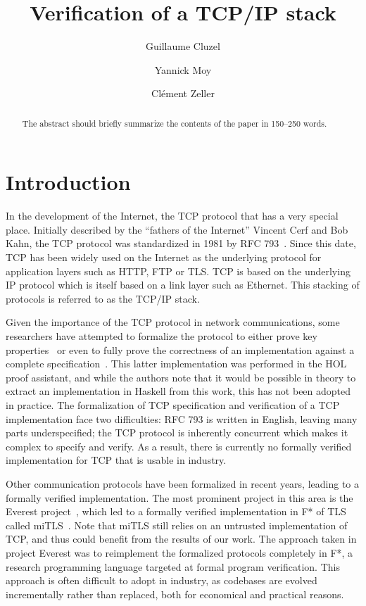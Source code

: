 \documentclass[runningheads]{llncs}
\title{Verification of a TCP/IP stack}
\author{Guillaume Cluzel\inst{1,2} \and
        Yannick Moy\inst{1} \and
        Cl\'ement Zeller\inst{3}}
\institute{Adacore \and
        \'Ecole Normale Sup\'erieure de Lyon \and
        Oryx Embedded}
\begin{document}

\maketitle

\begin{abstract}
    The abstract should briefly summarize the contents of the paper in
    150--250 words.

\end{abstract}

\section{Introduction}

    In the development of the Internet, the TCP protocol that has a very special place.
    Initially described by the ``fathers of the Internet'' Vincent Cerf and Bob Kahn, the TCP protocol was standardized in 1981 by RFC 793~\cite{rfc793}.
    Since this date, TCP has been widely used on the Internet as the underlying protocol for application layers such as HTTP,
    FTP or TLS. TCP is based on the underlying IP protocol which is itself
    based on a link layer such as Ethernet. This stacking of protocols is referred to as the TCP/IP stack.

    Given the importance of the TCP protocol in network communications, some researchers have attempted to formalize the protocol to either prove key properties~\cite{smith1996formal}
    or even to fully prove the correctness of an implementation against a complete specification~\cite{ridge2008rigorous}.
    This latter implementation was performed in the HOL proof assistant, and while the authors note that it would be possible in theory to extract an implementation in Haskell from
    this work, this has not been adopted in practice.
    The formalization of TCP specification and verification of a TCP implementation face two difficulties:
    RFC 793 is written in English, leaving many parts underspecified; the TCP protocol is inherently concurrent which makes it complex to specify and verify.
    As a result, there is currently no formally verified implementation for TCP that is usable in industry.

    Other communication protocols have been formalized in recent years, leading to a formally verified implementation.
    The most prominent project in this area is the Everest project~\cite{bhargavan2017everest}, which led to a formally verified implementation in F* of TLS called miTLS~\cite{bhargavan2013implementing}.
    Note that miTLS still relies on an untrusted implementation of TCP, and thus could benefit from the results of our work.
    The approach taken in project Everest was to reimplement the formalized protocols completely in F*, a research programming language targeted at formal program verification.
    This approach is often difficult to adopt in industry, as codebases are evolved incrementally rather than replaced, both for economical and practical reasons.
\end{document}
